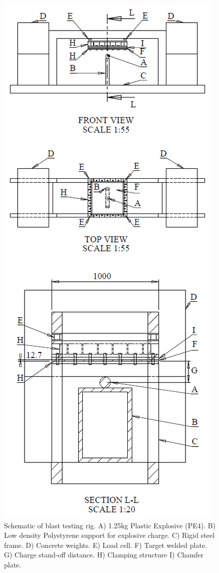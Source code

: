 \begin{figure}
	\centering
	\includegraphics[width=1\linewidth]{BlastRig4}
	\caption[BlastRig]{Schematic of blast testing rig. A) 1.25kg Plastic Explosive (PE4). B) Low density Polystyrene support for explosive charge. C) Rigid steel frame. D) Concrete weights. E) Load cell. F) Target welded plate. G) Charge stand-off distance. H) Clamping structure I) Chamfer plate.}
	\label{fig:blastrig}
\end{figure} 
